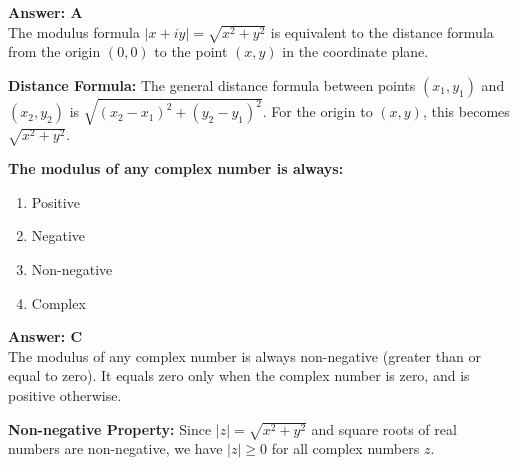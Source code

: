 \documentclass[12pt,a4paper]{article}
\begin{document}
\begin{answerstyle}
\textbf{Answer: A} \\
The modulus formula \( |x + iy| = \sqrt{x^2 + y^2} \) is equivalent to the distance formula from the origin \( (0, 0) \) to the point \( (x, y) \) in the coordinate plane.
\end{answerstyle}

\begin{conceptbox}
\textbf{Distance Formula:} The general distance formula between points \( (x_1, y_1) \) and \( (x_2, y_2) \) is \( \sqrt{(x_2-x_1)^2 + (y_2-y_1)^2} \). For the origin to \( (x, y) \), this becomes \( \sqrt{x^2 + y^2} \).
\end{conceptbox}

\newpage
\begin{questiontitle}[MCQ 95]
\textbf{The modulus of any complex number is always:}
\end{questiontitle}

\begin{partbox}[Options]
\begin{enumerate}[label=\Alph*.]
    \item Positive
    \item Negative
    \item Non-negative
    \item Complex
\end{enumerate}
\end{partbox}

\begin{answerstyle}
\textbf{Answer: C} \\
The modulus of any complex number is always non-negative (greater than or equal to zero). It equals zero only when the complex number is zero, and is positive otherwise.
\end{answerstyle}

\begin{conceptbox}
\textbf{Non-negative Property:} Since \( |z| = \sqrt{x^2 + y^2} \) and square roots of real numbers are non-negative, we have \( |z| \geq 0 \) for all complex numbers \( z \).
\end{conceptbox}

\newpage
\end{document}
